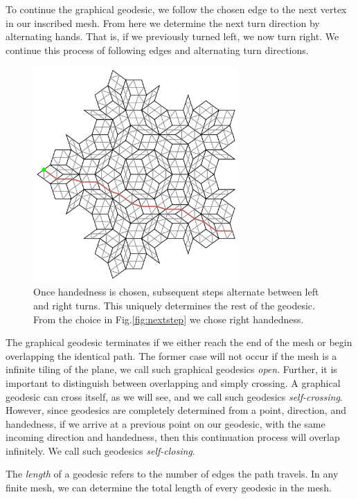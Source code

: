\documentclass[
  oneside,
  11pt, a4paper,
  footinclude=true,
  headinclude=true,
  cleardoublepage=empty
]{scrbook}
\begin{document}
To continue the graphical geodesic, we follow the chosen edge to the next vertex in our inscribed mesh. From here we determine the next turn direction by alternating hands. That is, if we previously turned left, we now turn right. We continue this process of following edges and alternating turn directions. 
\begin{figure}[H]
\centering
\includegraphics[width=0.7\textwidth]{Geodesic}
\caption[Continued Geodesic]{Once handedness is chosen, subsequent steps alternate between left and right turns. This uniquely determines the rest of the geodesic. From the choice in Fig.\ref{fig:nextstep} we chose right handedness.}
\label{fig:geocontinued}
\end{figure}
The graphical geodesic terminates if we either reach the end of the mesh or begin overlapping the identical path. The former case will not occur if the mesh is a infinite tiling of the plane, we call such graphical geodesics \textit{open}. Further, it is important to distinguish between overlapping and simply crossing. A graphical geodesic can cross itself, as we will see, and we call such geodesics \textit{self-crossing}. However, since geodesics are completely determined from a point, direction, and handedness, if we arrive at a previous point on our geodesic, with the same incoming direction and handedness, then this continuation process will overlap infinitely. We call such geodesics \textit{self-closing}.

The \textit{length} of a geodesic refers to the number of edges the path travels. In any finite mesh, we can determine the total length of every geodesic in the mesh. 
\end{document}
